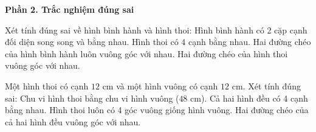 \textbf{Phần 2. Trắc nghiệm đúng sai}

\begin{ex} %
Xét tính đúng sai về hình bình hành và hình thoi:
\choiceTF
{\True Hình bình hành có 2 cặp cạnh đối diện song song và bằng nhau.}
{\True Hình thoi có 4 cạnh bằng nhau.}
{Hai đường chéo của hình bình hành luôn vuông góc với nhau.}
{\True Hai đường chéo của hình thoi vuông góc với nhau.}
\end{ex}

\begin{ex} %
Một hình thoi có cạnh $12\text{ cm}$ và một hình vuông có cạnh $12\text{ cm}$. Xét tính đúng sai:
\choiceTF
{\True Chu vi hình thoi bằng chu vi hình vuông ($48\text{ cm}$).}
{\True Cả hai hình đều có 4 cạnh bằng nhau.}
{Hình thoi luôn có 4 góc vuông giống hình vuông.}
{\True Hai đường chéo của cả hai hình đều vuông góc với nhau.}
\end{ex}

